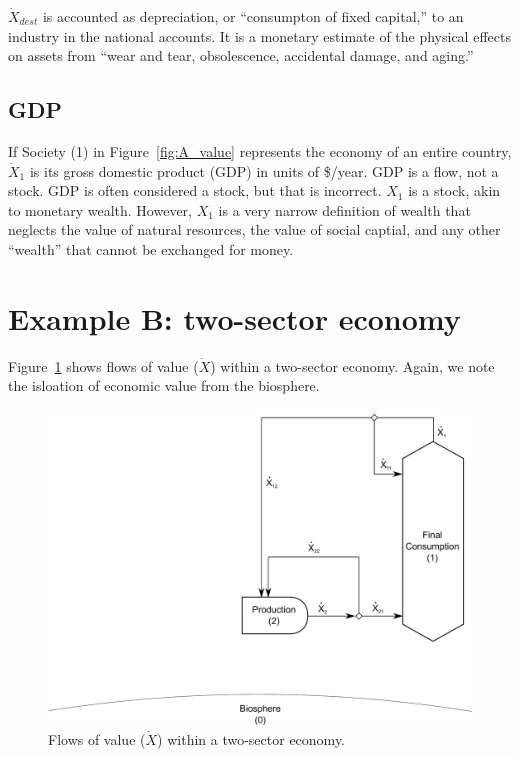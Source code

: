 $\dot{X}_{dest}$ is accounted as depreciation, 
or ``consumpton of fixed capital,'' %
to an industry in the national accounts. 
It is a monetary estimate of the physical effects on assets from 
``wear and tear, obsolescence, accidental damage,
and aging.''~\cite{katz2008} 


\subsection{GDP}

If Society (1) in Figure~\ref{fig:A_value} represents 
the economy of an entire country, 
$\dot{X}_{1}$ is its gross domestic product (GDP)
in units of \$/year. 
GDP is a flow, not a stock. 
GDP is often considered a stock, but that is incorrect. 
$X_{1}$ is a stock, akin to monetary wealth. 
However, $X_{1}$ is a very
narrow definition of wealth
that neglects the value of natural resources, 
the value of social captial, and any
other ``wealth'' that cannot be exchanged for money. 


\section{Example B: two-sector economy} %

Figure~\ref{fig:B_value} shows flows of value ($\dot{X}$) 
within a two-sector economy. 
Again, we note the isloation of economic value from the biosphere.

\begin{landscape}
\begin{figure}[!ht]
\centering
\includegraphics[width=0.8\linewidth]{Part_2/Chapter_Values/images/2_sector_value.pdf}
\caption[Flows of value within a two-sector economy]{Flows of value ($\dot{X}$) within a two-sector economy.}
\label{fig:B_value}
\end{figure}
\end{landscape}

